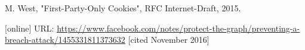 \documentclass[conference, letterpaper, 10pt]{IEEEtran}
\begin{document}
\begin{thebibliography}{13}
 M. West, "First-Party-Only Cookies", RFC Internet-Draft, 2015.

 [online] URL:
\url{https://www.facebook.com/notes/protect-the-graph/preventing-a-breach-attack/1455331811373632}
[cited November 2016]





\end{thebibliography}
\end{document}
